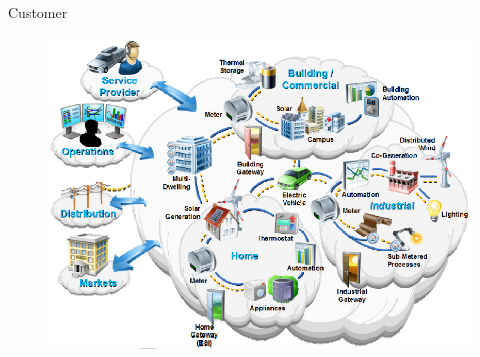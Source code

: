 



\begin{frame}[fragile]{Customer} 
	\begin{figure}[h] 
		\includegraphics[scale=0.45]{imgs/cust.png}
	\end{figure}
\end{frame}

